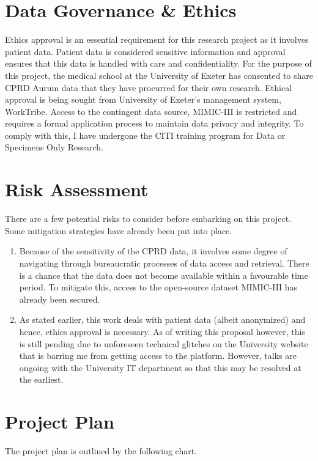 \documentclass[%
 reprint,
 amsmath,amssymb,
 aps,
 nofootinbib,
]{revtex4-2}
\theoremstyle{definition}
\begin{document}
\section{\label{gov}Data Governance \& Ethics}
Ethics approval is an essential requirement for this research project as it involves patient data. Patient data is considered sensitive information and approval ensures that this data is handled with care and confidentiality. For the purpose of this project, the medical school at the University of Exeter has consented to share CPRD Aurum data that they have procurred for their own research. Ethical approval is being sought from University of Exeter's management system, WorkTribe. Access to the contingent data source, MIMIC-III is restricted and requires a formal application process to maintain data privacy and integrity. To comply with this, I have undergone the CITI training program for Data or Specimens Only Research.

\section{\label{risk}Risk Assessment}
There are a few potential risks to consider before embarking on this project. Some mitigation strategies have already been put into place.

\begin{enumerate}
\item Because of the sensitivity of the CPRD data, it involves some degree of navigating through bureaucratic processes of data access and retrieval. There is a chance that the data does not become available within a favourable time period. To mitigate this, access to the open-source dataset MIMIC-III has already been secured.
\item As stated earlier, this work deals with patient data (albeit anonymized) and hence, ethics approval is necessary. As of writing this proposal however, this is still pending due to unforeseen technical glitches on the University website that is barring me from getting access to the platform. However, talks are ongoing with the University IT department so that this may be resolved at the earliest.
\end{enumerate}

\section{\label{plan}Project Plan}
The project plan is outlined by the following chart.
\end{document}
